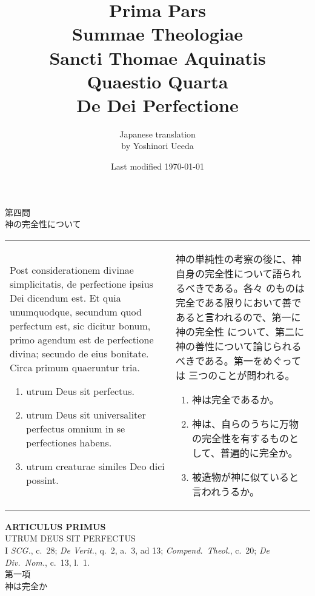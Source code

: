 \documentclass[10pt]{jsarticle}
\title{{\bf Prima Pars}\\{\HUGE Summae Theologiae}\\Sancti Thomae
Aquinatis\\Quaestio Quarta\\{\bf De Dei Perfectione}}
\author{Japanese translation\\by Yoshinori {\sc Ueeda}}
\date{Last modified \today}
\begin{document}
\maketitle
\begin{center}
 {\Large 第四問\\神の完全性について}
\end{center}

\begin{longtable}{p{21em}p{21em}}
Post considerationem divinae simplicitatis, de perfectione ipsius Dei
 dicendum est. Et quia unumquodque, secundum quod perfectum est, sic
 dicitur bonum, primo agendum est de perfectione divina; secundo de eius
 bonitate. Circa primum quaeruntur tria. 
\begin{enumerate}
 \item utrum Deus sit perfectus.
 \item utrum Deus sit universaliter perfectus omnium in se
 perfectiones habens.
 \item utrum creaturae similes Deo dici possint.
\end{enumerate}

&

神の単純性の考察の後に、神自身の完全性について語られるべきである。各々
のものは完全である限りにおいて善であると言われるので、第一に神の完全性
について、第二に神の善性について論じられるべきである。第一をめぐっては
三つのことが問われる。
\begin{enumerate}
 \item 神は完全であるか。
 \item 神は、自らのうちに万物の完全性を有するものとして、普遍的に完全か。
 \item 被造物が神に似ていると言われうるか。
\end{enumerate}

\end{longtable}

\newpage
{}
\begin{center}
 {\Large {\bf ARTICULUS PRIMUS}}\\
 {\large UTRUM DEUS SIT PERFECTUS}\\
 {\footnotesize I {\itshape SCG.}, c.~28; {\itshape De Verit.}, q.~2,
 a.~3, ad 13; {\itshape Compend.~Theol.}, c.~20; {\itshape De
 Div.~Nom.}, c.~13, l.~1.}\\
 {\Large 第一項\\神は完全か}
\end{center}
\end{document}
